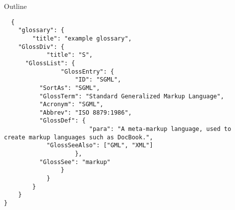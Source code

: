 \documentclass[presentation]{beamer}
\author{milad kamali}
\date{\today}
\title{}
\begin{document}
\begin{frame}{Outline}
\tableofcontents
\end{frame}

\begin{verbatim}
  {
    "glossary": {
        "title": "example glossary",
    "GlossDiv": {
            "title": "S",
      "GlossList": {
                "GlossEntry": {
                    "ID": "SGML",
          "SortAs": "SGML",
          "GlossTerm": "Standard Generalized Markup Language",
          "Acronym": "SGML",
          "Abbrev": "ISO 8879:1986",
          "GlossDef": {
                        "para": "A meta-markup language, used to create markup languages such as DocBook.",
            "GlossSeeAlso": ["GML", "XML"]
                    },
          "GlossSee": "markup"
                }
            }
        }
    }
}
\end{verbatim}
\end{document}
